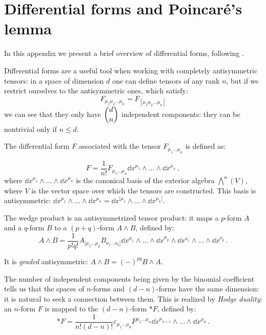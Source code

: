 \documentclass[main.tex]{subfiles}
\begin{document}
\clearpage
\appendix

\section{Differential forms and Poincaré's lemma} \label{sec:differential-forms}

In this appendix we present a brief overview of differential forms, following \cite{Lechner}.

Differential forms are a useful tool when working with completely antisymmetric tensors:
in a space of dimension \(d\) one can define tensors of any rank \(n\), but if we restrict ourselves to the antisymmetric ones, which satisfy:
%
\begin{equation}
  F_{\mu_1 \mu_2 \dots \mu_{n}} 
 = F_{[\mu_1 \mu_2 \dots \mu_{n}]}
\end{equation}
%
we can see that they only have \(\dbinom{d}{n}\) independent components: they can be nontrivial only if \(n \leq d\).  

The differential form $F$ associated with the tensor \(F_{\mu_1 \dots \mu_{n}}\) is defined as:

\begin{equation}
  F = \frac{1}{n!} F_{\mu_1 \dots \mu_{n}} \dd{x^{\mu_1}} \wedge \dots \wedge \dd{x^{\mu_n}}\,,
\end{equation}
%
where \(\dd{x^{\mu_1}} \wedge \dots \wedge \dd{x^{\mu_n}}\) is the canonical basis of the exterior algebra \(\bigwedge^n (V)\), where \(V\) is the vector space over which the tensors are constructed.
This basis is antisymmetric: \(\dd{x^{\mu_1}} \wedge \dots \wedge \dd{x^{\mu_n}} = \dd{x^{[\mu_1}} \wedge \dots \wedge \dd{x^{\mu_n]}}\).

The wedge product is an antisymmetrized tensor product: it maps a \(p\)-form \(A\) and a \(q\)-form \(B\) to a \((p+q)\)-form \(A \wedge B\), defined by:
\begin{equation}
  A \wedge B = \frac{1}{p!q!} 
  A_{[\mu_1 \dots \mu_{p}} B_{\nu_1 \dots \nu_{q}]}
  \dd{x^{\mu_1}} \wedge \dots \wedge \dd{x^{\mu_p}} \wedge
  \dd{x^{\nu_1}} \wedge \dots \wedge \dd{x^{\nu_q}}\,.
\end{equation}

It is \emph{graded} antisymmetric: \(A \wedge B = (-)^{pq} B \wedge A\).

The number of independent components being given by the binomial coefficient tells us that the spaces of \(n\)-forms and \((d-n)\)-forms have the same dimension: it is natural to seek a connection between them. This is realized by \emph{Hodge duality}: an \(n\)-form \(F\) is mapped to the \((d-n)\)-form \(*F\), defined by:
\begin{equation}
  *F = 
  \frac{1}{n!(d-n)!} \varepsilon_{\mu_1 \dots \mu_d} F^{\mu_1 \dots \mu_n} \dd{x^{\mu_{n+1}}} \wedge \dots \wedge \dd{x^{\mu_{d}}}\,.
\end{equation}
\end{document}
